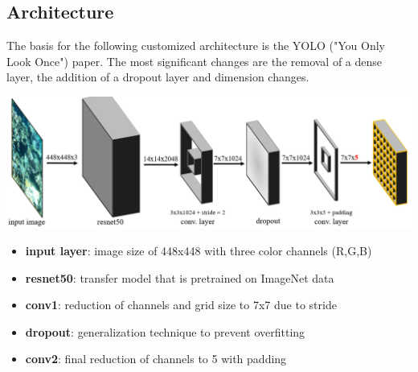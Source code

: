 \documentclass[landscape,a2,final,12pt]{issposter}
\begin{document}
\begin{multicols}{3}
\section{Architecture}
    \begin{small}
        The basis for the following customized architecture is the YOLO ("You Only Look Once") paper.
        The most significant changes are the removal of a dense layer, the addition of a dropout layer and dimension changes.
    \end{small}

    \begin{center}
        \includegraphics[scale=0.7]{2_architecture.png}
    \end{center}
    \begin{small}
        \begin{itemize}
            \item {\textbf{input layer}: image size of 448x448 with three color channels (R,G,B)}
            \item {\textbf{resnet50}: transfer model that is pretrained on ImageNet data}
            \item {\textbf{conv1}: reduction of channels and grid size to 7x7 due to stride}
            \item {\textbf{dropout}: generalization technique to prevent overfitting}
            \item {\textbf{conv2}: final reduction of channels to 5 with padding}
        \end{itemize}
    \end{small}
    \columnbreak

\end{multicols}
\end{document}
